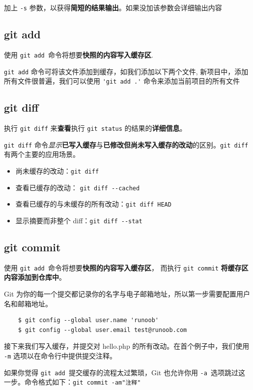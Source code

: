 \documentclass[UTF8,a4paper,12pt]{ctexbook}
\begin{document}
			  加上 \verb|-s| 参数，以获得\textbf{简短的结果输出}。如果没加该参数会详细输出内容
			  
		  \subsection{git add}
			  使用 \verb|git add |命令将想要\textbf{快照的内容写入缓存区}.
		  
			  \verb|git add| 命令可将该文件添加到缓存，如我们添加以下两个文件,	新项目中，添加所有文件很普遍，我们可以使用 \verb|'git add .'| 命令来添加当前项目的所有文件
			  
		\subsection{git diff}
			执行 \verb|git diff| 来\textbf{查看}执行 \verb|git status| 的结果的\textbf{详细信息}。
			
			\verb|git diff| 命令\textit{显示}\textbf{已写入缓存}与\textbf{已修改但尚未写入缓存的改动}的区别。\verb|git diff| 有两个主要的应用场景。
			
			\begin{itemize}
				\item 尚未缓存的改动：\verb|git diff| 
				\item 查看已缓存的改动： \verb|git diff --cached| 
				\item 查看已缓存的与未缓存的所有改动：\verb|git diff HEAD| 
				\item 显示摘要而非整个 diff：\verb|git diff --stat| 
			\end{itemize}
			
		\subsection{git commit}
			使用 \verb|git add |命令将想要\textbf{快照的内容写入缓存区}， 而执行 \verb|git commit| \textbf{将缓存区内容添加到仓库中}。

			Git 为你的每一个提交都记录你的名字与电子邮箱地址，所以第一步需要配置用户名和邮箱地址。
			\begin{lstlisting}
	$ git config --global user.name 'runoob'
	$ git config --global user.email test@runoob.com
			\end{lstlisting}
						
			接下来我们写入缓存，并提交对 hello.php 的所有改动。在首个例子中，我们使用 \verb|-m| 选项以在命令行中提供提交注释。

			如果你觉得 \verb|git add |提交缓存的流程太过繁琐，Git 也允许你用 \verb|-a |选项跳过这一步。命令格式如下：\verb|git commit -am"注释"|
		
\end{document}
